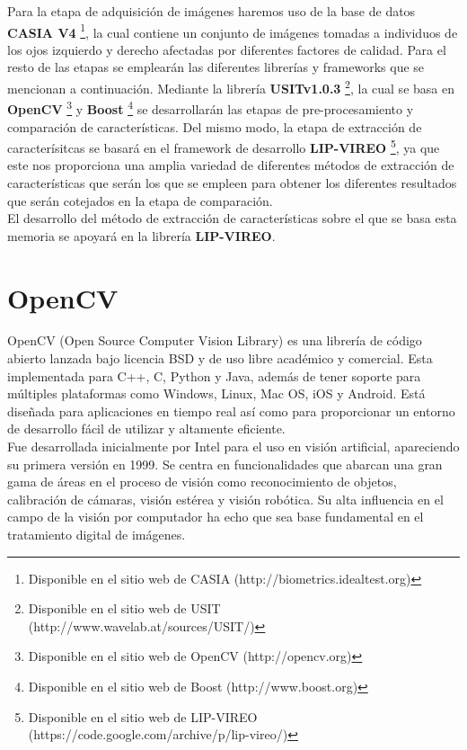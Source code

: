 Para la etapa de adquisición de imágenes haremos uso de la base de datos \textbf{CASIA V4} \footnote{Disponible en el sitio web de CASIA (http://biometrics.idealtest.org)}, la cual contiene un conjunto de imágenes tomadas a individuos de los ojos izquierdo y derecho afectadas por diferentes factores de calidad. Para el resto de las etapas se emplearán las diferentes librerías y frameworks que se mencionan a continuación. Mediante la librería \textbf{USITv1.0.3} \footnote{Disponible en el sitio web de USIT (http://www.wavelab.at/sources/USIT/)}, la cual se basa en \textbf{OpenCV} \footnote{Disponible en el sitio web de OpenCV (http://opencv.org)} y \textbf{Boost} \footnote{Disponible en el sitio web de Boost (http://www.boost.org)} se desarrollarán las etapas de pre-procesamiento y comparación de características. Del mismo modo, la etapa de extracción de caracterísitcas se basará en el framework de desarrollo \textbf{LIP-VIREO} \footnote{Disponible en el sitio web de LIP-VIREO (https://code.google.com/archive/p/lip-vireo/)}, ya que este nos proporciona una amplia variedad de diferentes métodos de extracción de características que serán los que se empleen para obtener los diferentes resultados que serán cotejados en la etapa de comparación. \\

El desarrollo del método de extracción de características sobre el que se basa esta memoria se apoyará en la librería \textbf{LIP-VIREO}. \\




\section{OpenCV}

OpenCV (Open Source Computer Vision Library) es una librería de código abierto lanzada bajo licencia BSD y de uso libre académico y comercial. Esta implementada para C++, C, Python y Java, además de tener soporte para múltiples plataformas como Windows, Linux, Mac OS, iOS y Android. Está diseñada para aplicaciones en tiempo real así como para proporcionar un entorno de desarrollo fácil de utilizar y altamente eficiente. \\

Fue desarrollada inicialmente por Intel para el uso en visión artificial, apareciendo su primera versión en 1999. Se centra en funcionalidades que abarcan una gran gama de áreas en el proceso de visión como reconocimiento de objetos, calibración de cámaras, visión estérea y visión robótica. Su alta influencia en el campo de la visión por computador ha echo que sea base fundamental en el tratamiento digital de imágenes. \\

